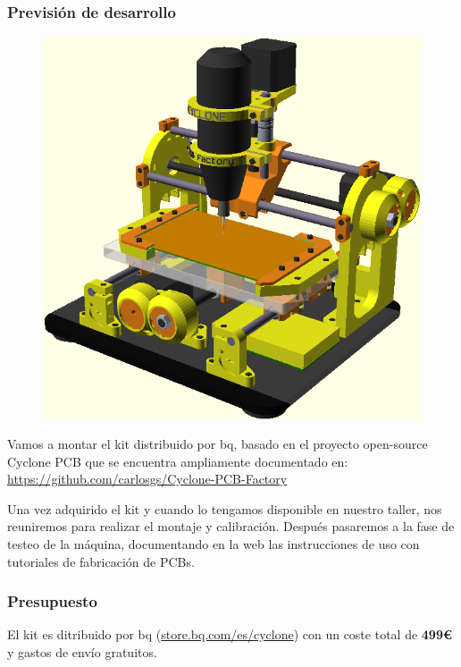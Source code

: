 \documentclass[12pt,twoside]{report}
\begin{document}
\subsubsection{Previsión de desarrollo}

\begin{figure}\centering
    \includegraphics[scale=0.32]{fotos/Cyclone}
    \caption*{}
\end{figure}

Vamos a montar el kit distribuido por bq, basado en el proyecto open-source Cyclone PCB que se encuentra ampliamente documentado en: \url{https://github.com/carlosgs/Cyclone-PCB-Factory}

Una vez adquirido el kit y cuando lo tengamos disponible en nuestro taller, nos reuniremos para realizar el montaje y calibración.
Después pasaremos a la fase de testeo de la máquina, documentando en la web las instrucciones de uso con tutoriales de fabricación de PCBs.

\subsubsection{Presupuesto}
El kit es ditribuido por bq (\url{store.bq.com/es/cyclone}) con un coste total de {\bf 499\euro{}} y gastos de envío gratuitos.
\end{document}
